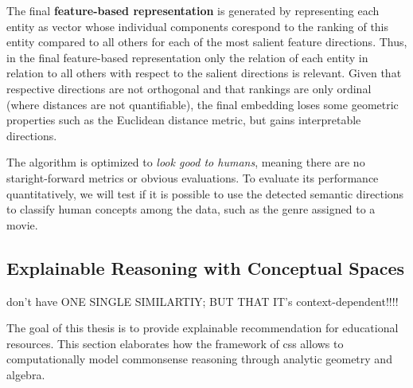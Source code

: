 The final \textbf{feature-based representation} is generated by representing each entity as vector whose individual components corespond to the ranking of this entity compared to all others for each of the most salient feature directions. Thus, in the final feature-based representation only the relation of each entity in relation to all others with respect to the salient directions is relevant. Given that respective directions are not orthogonal \cite[22]{Derrac2015} and that rankings are only ordinal (where distances are not quantifiable), the final embedding loses some geometric properties such as the Euclidean distance metric, but gains interpretable directions.

The algorithm is optimized to \textit{look good to humans}, meaning there are no staright-forward metrics or obvious evaluations. To evaluate its performance quantitatively, we will test if it is possible to use the detected semantic directions to classify human concepts among the data, such as the genre assigned to a movie.



\subsection{Explainable Reasoning with Conceptual Spaces}
\label{sec:reasoning}




 don't have ONE SINGLE SIMILARTIY; BUT THAT IT's context-dependent!!!!


The goal of this thesis is to provide explainable recommendation for educational resources. This section elaborates how the framework of \glspl{cs} allows to computationally model commonsense reasoning through analytic geometry and algebra.

